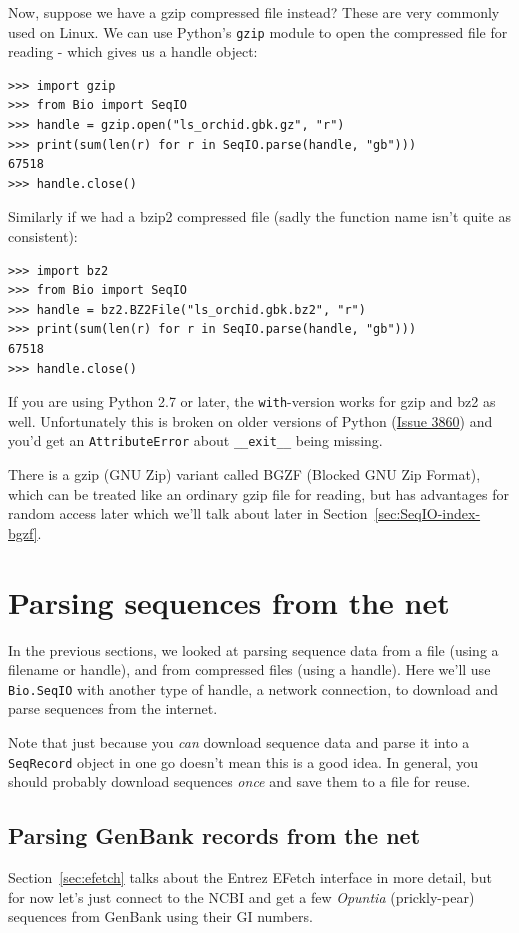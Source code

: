 \documentclass{report}
\begin{document}
Now, suppose we have a gzip compressed file instead? These are very
commonly used on Linux. We can use Python's \verb|gzip| module to open
the compressed file for reading - which gives us a handle object:

\begin{verbatim}
>>> import gzip
>>> from Bio import SeqIO
>>> handle = gzip.open("ls_orchid.gbk.gz", "r")
>>> print(sum(len(r) for r in SeqIO.parse(handle, "gb")))
67518
>>> handle.close()
\end{verbatim}

Similarly if we had a bzip2 compressed file (sadly the function name isn't
quite as consistent):

\begin{verbatim}
>>> import bz2
>>> from Bio import SeqIO
>>> handle = bz2.BZ2File("ls_orchid.gbk.bz2", "r")
>>> print(sum(len(r) for r in SeqIO.parse(handle, "gb")))
67518
>>> handle.close()
\end{verbatim}

\noindent
If you are using Python 2.7 or later, the \verb|with|-version works for
gzip and bz2 as well. Unfortunately this is broken on older versions of
Python (\href{http://bugs.python.org/issue3860}{Issue 3860}) and you'd
get an \verb|AttributeError| about \verb|__exit__| being missing.

There is a gzip (GNU Zip) variant called BGZF (Blocked GNU Zip Format),
which can be treated like an ordinary gzip file for reading, but has
advantages for random access later which we'll talk about later in
Section~\ref{sec:SeqIO-index-bgzf}.

\section{Parsing sequences from the net}
\label{sec:SeqIO_Online}
In the previous sections, we looked at parsing sequence data from a file
(using a filename or handle), and from compressed files (using a handle).
Here we'll use \verb|Bio.SeqIO| with another type of handle, a network
connection, to download and parse sequences from the internet.

Note that just because you \emph{can} download sequence data and parse it into
a \verb|SeqRecord| object in one go doesn't mean this is a good idea.
In general, you should probably download sequences \emph{once} and save them to
a file for reuse.

\subsection{Parsing GenBank records from the net}
\label{sec:SeqIO_GenBank_Online}
Section~\ref{sec:efetch} talks about the Entrez EFetch interface in more detail,
but for now let's just connect to the NCBI and get a few \textit{Opuntia} (prickly-pear)
sequences from GenBank using their GI numbers.
\end{document}
